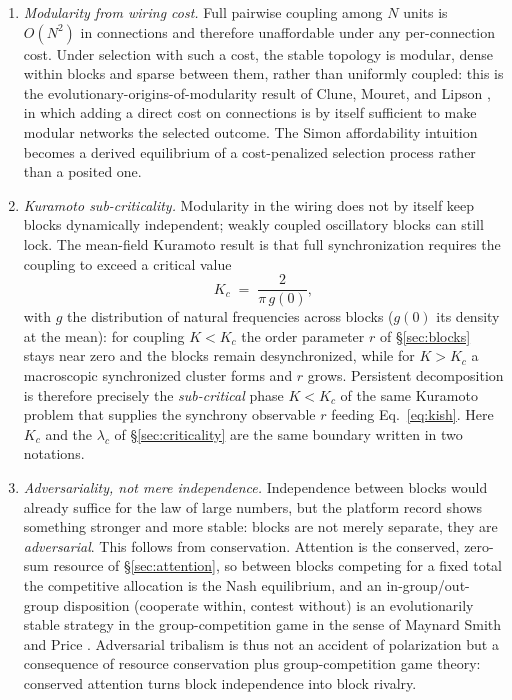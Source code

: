 \documentclass[11pt]{article}
\begin{document}
\begin{enumerate}[label=(\alph*),itemsep=3pt]
\item \emph{Modularity from wiring cost.} Full pairwise coupling among $N$ units is $O(N^2)$ in connections and therefore unaffordable under any per-connection cost. Under selection with such a cost, the stable topology is modular, dense within blocks and sparse between them, rather than uniformly coupled: this is the evolutionary-origins-of-modularity result of Clune, Mouret, and Lipson \cite{clune2013}, in which adding a direct cost on connections is by itself sufficient to make modular networks the selected outcome. The Simon affordability intuition becomes a derived equilibrium of a cost-penalized selection process rather than a posited one.
\item \emph{Kuramoto sub-criticality.} Modularity in the wiring does not by itself keep blocks dynamically independent; weakly coupled oscillatory blocks can still lock. The mean-field Kuramoto result \cite{strogatz2000} is that full synchronization requires the coupling to exceed a critical value
\begin{equation}
K_c \;=\; \frac{2}{\pi\, g(0)},
\label{eq:kc}
\end{equation}
with $g$ the distribution of natural frequencies across blocks ($g(0)$ its density at the mean): for coupling $K<K_c$ the order parameter $r$ of \S\ref{sec:blocks} stays near zero and the blocks remain desynchronized, while for $K>K_c$ a macroscopic synchronized cluster forms and $r$ grows. Persistent decomposition is therefore precisely the \emph{sub-critical} phase $K<K_c$ of the same Kuramoto problem that supplies the synchrony observable $r$ feeding Eq.~\eqref{eq:kish}. Here $K_c$ and the $\lambda_c$ of \S\ref{sec:criticality} are the same boundary written in two notations.
\item \emph{Adversariality, not mere independence.} Independence between blocks would already suffice for the law of large numbers, but the platform record shows something stronger and more stable: blocks are not merely separate, they are \emph{adversarial}. This follows from conservation. Attention is the conserved, zero-sum resource of \S\ref{sec:attention}, so between blocks competing for a fixed total the competitive allocation is the Nash equilibrium, and an in-group/out-group disposition (cooperate within, contest without) is an evolutionarily stable strategy in the group-competition game in the sense of Maynard Smith and Price \cite{maynardsmith1973}. Adversarial tribalism is thus not an accident of polarization but a consequence of resource conservation plus group-competition game theory: conserved attention turns block independence into block rivalry.
\end{enumerate}
\end{document}
